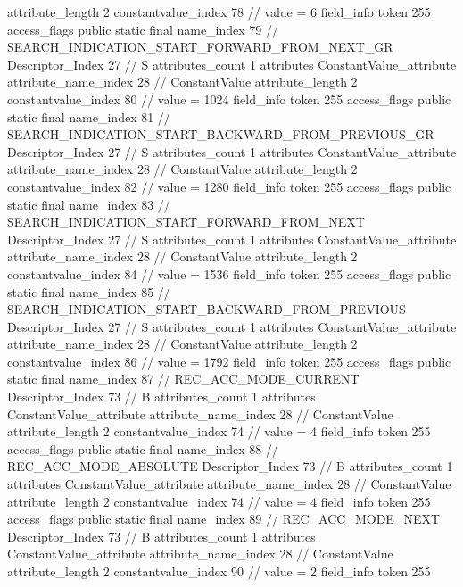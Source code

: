{{{{{{{					attribute_length	2
					constantvalue_index	78		// value = 6
				}
				}
			}
			field_info {
				token	255
				access_flags	public static final
				name_index	79		// SEARCH_INDICATION_START_FORWARD_FROM_NEXT_GR
				Descriptor_Index	27		// S
				attributes_count	1
				attributes {
				ConstantValue_attribute {
					attribute_name_index	28		// ConstantValue
					attribute_length	2
					constantvalue_index	80		// value = 1024
				}
				}
			}
			field_info {
				token	255
				access_flags	public static final
				name_index	81		// SEARCH_INDICATION_START_BACKWARD_FROM_PREVIOUS_GR
				Descriptor_Index	27		// S
				attributes_count	1
				attributes {
				ConstantValue_attribute {
					attribute_name_index	28		// ConstantValue
					attribute_length	2
					constantvalue_index	82		// value = 1280
				}
				}
			}
			field_info {
				token	255
				access_flags	public static final
				name_index	83		// SEARCH_INDICATION_START_FORWARD_FROM_NEXT
				Descriptor_Index	27		// S
				attributes_count	1
				attributes {
				ConstantValue_attribute {
					attribute_name_index	28		// ConstantValue
					attribute_length	2
					constantvalue_index	84		// value = 1536
				}
				}
			}
			field_info {
				token	255
				access_flags	public static final
				name_index	85		// SEARCH_INDICATION_START_BACKWARD_FROM_PREVIOUS
				Descriptor_Index	27		// S
				attributes_count	1
				attributes {
				ConstantValue_attribute {
					attribute_name_index	28		// ConstantValue
					attribute_length	2
					constantvalue_index	86		// value = 1792
				}
				}
			}
			field_info {
				token	255
				access_flags	public static final
				name_index	87		// REC_ACC_MODE_CURRENT
				Descriptor_Index	73		// B
				attributes_count	1
				attributes {
				ConstantValue_attribute {
					attribute_name_index	28		// ConstantValue
					attribute_length	2
					constantvalue_index	74		// value = 4
				}
				}
			}
			field_info {
				token	255
				access_flags	public static final
				name_index	88		// REC_ACC_MODE_ABSOLUTE
				Descriptor_Index	73		// B
				attributes_count	1
				attributes {
				ConstantValue_attribute {
					attribute_name_index	28		// ConstantValue
					attribute_length	2
					constantvalue_index	74		// value = 4
				}
				}
			}
			field_info {
				token	255
				access_flags	public static final
				name_index	89		// REC_ACC_MODE_NEXT
				Descriptor_Index	73		// B
				attributes_count	1
				attributes {
				ConstantValue_attribute {
					attribute_name_index	28		// ConstantValue
					attribute_length	2
					constantvalue_index	90		// value = 2
				}
				}
			}
			field_info {
				token	255
}}}}}

